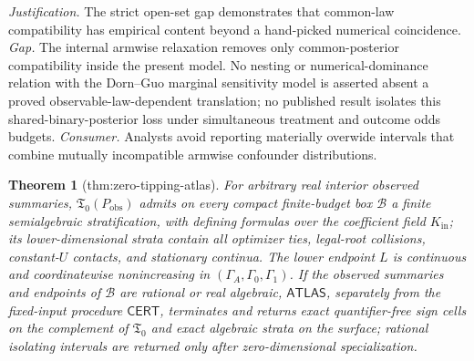 \documentclass{article}
\newtheorem{theorem}{Theorem}
\begin{document}
\par\smallskip\noindent \textit{Justification.} The strict open-set gap demonstrates that common-law compatibility has empirical content beyond a hand-picked numerical coincidence. \textit{Gap.} The internal armwise relaxation removes only common-posterior compatibility inside the present model.  No nesting or numerical-dominance relation with the Dorn--Guo marginal sensitivity model is asserted absent a proved observable-law-dependent translation; no published result isolates this shared-binary-posterior loss under simultaneous treatment and outcome odds budgets. \textit{Consumer.} Analysts avoid reporting materially overwide intervals that combine mutually incompatible armwise confounder distributions.

\begin{theorem}[thm:zero-tipping-atlas]\label{thm:zero-tipping-atlas}
For arbitrary real interior observed summaries, \(\mathfrak T_0(P_{\mathrm{obs}})\) admits on every compact finite-budget box \(\mathcal B\) a finite semialgebraic stratification, with defining formulas over the coefficient field \(K_{\mathrm{in}}\); its lower-dimensional strata contain all optimizer ties, legal-root collisions, constant-\(U\) contacts, and stationary continua.  The lower endpoint \(L\) is continuous and coordinatewise nonincreasing in \((\Gamma_A,\Gamma_0,\Gamma_1)\).  If the observed summaries and endpoints of \(\mathcal B\) are rational or real algebraic, \(\mathsf{ATLAS}\), separately from the fixed-input procedure \(\mathsf{CERT}\), terminates and returns exact quantifier-free sign cells on the complement of \(\mathfrak T_0\) and exact algebraic strata on the surface; rational isolating intervals are returned only after zero-dimensional specialization.
\end{theorem}
\end{document}
